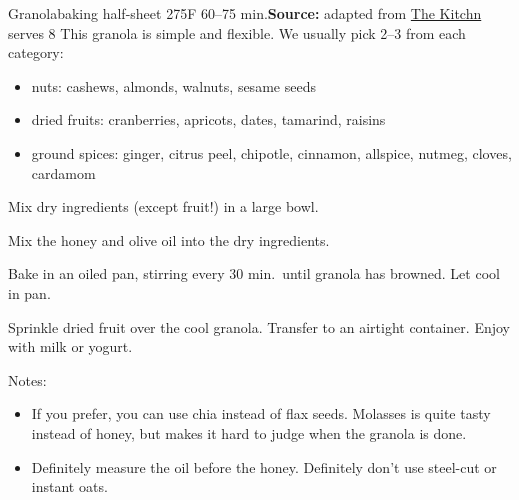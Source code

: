 \begin{recipe}{Granola}{baking half-sheet \hfill 275\0F \hfill 60--75 min.}{\textbf{Source:} adapted from \href{https://www.thekitchn.com/granola-recipe-258376}{The Kitchn} \hfill serves 8}
 \freeform This granola is simple and flexible. We usually pick 2--3 from each category:
 \begin{itemize}
  \item nuts: cashews, almonds, walnuts, sesame seeds
  \item dried fruits: cranberries, apricots, dates, tamarind, raisins
  \item ground spices: ginger, citrus peel, chipotle, cinnamon, allspice, nutmeg, cloves, cardamom
 \end{itemize}

 Mix dry ingredients (except fruit!) in a large bowl.

 Mix the honey and olive oil into the dry ingredients.

 \newstep Bake in an oiled pan, stirring every 30 min.\ until granola has browned. Let cool in pan.

 Sprinkle dried fruit over the cool granola. Transfer to an airtight container. Enjoy with milk or yogurt.

 \freeform Notes:
 \begin{itemize}
  \item If you prefer, you can use chia instead of flax seeds. Molasses is quite tasty instead of honey, but makes it hard to judge when the granola is done.
  \item Definitely measure the oil before the honey. Definitely don't use steel-cut or instant oats.
 \end{itemize}
\end{recipe}

